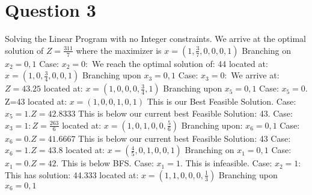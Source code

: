 \documentclass[10pt, letterpaper]{paper}
\begin{document}
\section*{Question 3}
Solving the Linear Program with no Integer constraints. 
We arrive at the optimal solution of $Z=\frac{311}{7}$ where the maximizer is $x=(1,\frac{3}{7},0,0,0,1)$
\newline
Branching on $x_2 = 0,1$
\newline
\indent Case: $x_2 = 0:$ We reach the optimal solution of: 44 located at: $x=(1,0,\frac{3}{4},0,0,1)$
\indent \newline
\indent Branching upon $x_3 = 0,1$
\indent \newline
\indent \indent Case: $x_3 = 0:$ We arrive at: $Z = 43.25$ located at: $x=(1,0,0,0,\frac{3}{4},1)$
\indent \indent \newline
\indent \indent Branching upon $x_5 = 0,1$
\indent \indent \newline
\indent \indent \indent Case: $x_5 = 0.$ Z=43 located at: $x=(1,0,0,1,0,1)$ This is our Best Feasible Solution.
\indent \indent \indent \newline
\indent \indent \indent Case: $x_5 = 1. Z=42.8333$ This is below our current best Feasible Solution: 43.
\indent \indent \indent \newline
\indent \indent Case: $x_3 = 1: Z = \frac{263}{6}$ located at: $x=(1,0,1,0,0,\frac{5}{6})$
\indent \indent \newline
\indent \indent Branching upon: $x_6 = 0,1$
\indent \indent \newline
\indent \indent \indent Case: $x_6 = 0. Z=41.6667$ This is below our current best Feasible Solution: 43
\indent \indent \indent \newline
\indent \indent \indent Case: $x_6 = 1. Z=43.8$ located at: $x=( \frac{4}{5},0,1,0,0,1)$
\indent \indent \indent \newline
\indent \indent \indent Branching on $x_1 = 0,1$
\indent \indent \indent \newline
\indent \indent \indent \indent Case: $x_1 = 0. Z=42.$ This is below BFS.
\indent \indent \indent \indent \newline
\indent \indent \indent \indent Case: $x_1 = 1.$ This is infeasible.
\indent \indent \indent \indent \newline
\indent Case: $x_2 = 1:$ This has solution: 44.333 located at: $x= (1,1,0,0,0,\frac{1}{3})$
\indent \newline
\indent Branching upon $x_6 = 0,1$
\indent \newline
\end{document}
